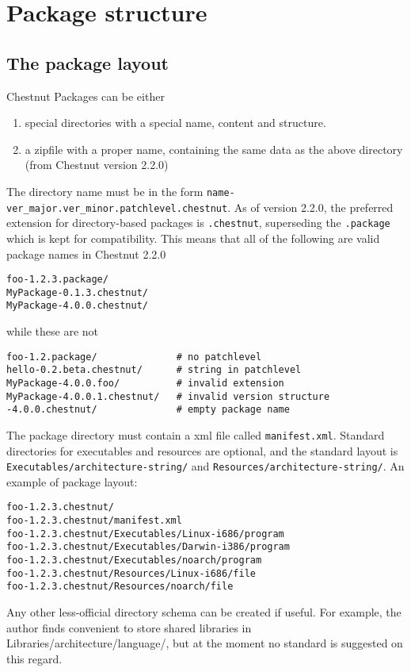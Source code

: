 \section{Package structure}

\subsection{The package layout}

Chestnut Packages can be either 
\begin{enumerate}
\item special directories with a special name, content and structure.
\item a zipfile with a proper name, containing the same data as the above directory (from Chestnut version 2.2.0) 
\end{enumerate}

The directory name must be in the form \verb+name-ver_major.ver_minor.patchlevel.chestnut+.
As of version 2.2.0, the preferred extension for directory-based packages is
\verb+.chestnut+, superseding the \verb+.package+ which is kept for compatibility.
This means that all of the following are valid package names in Chestnut 2.2.0
\begin{verbatim}
foo-1.2.3.package/
MyPackage-0.1.3.chestnut/
MyPackage-4.0.0.chestnut/
\end{verbatim}
while these are not
\begin{verbatim}
foo-1.2.package/              # no patchlevel
hello-0.2.beta.chestnut/      # string in patchlevel
MyPackage-4.0.0.foo/          # invalid extension
MyPackage-4.0.0.1.chestnut/   # invalid version structure
-4.0.0.chestnut/              # empty package name
\end{verbatim}

The package directory must contain a xml file called \verb+manifest.xml+.
Standard directories for executables and resources are optional, and the
standard layout is \verb+Executables/architecture-string/+ and
\verb+Resources/architecture-string/+.
An example of package layout:
\begin{verbatim}
foo-1.2.3.chestnut/
foo-1.2.3.chestnut/manifest.xml
foo-1.2.3.chestnut/Executables/Linux-i686/program
foo-1.2.3.chestnut/Executables/Darwin-i386/program
foo-1.2.3.chestnut/Executables/noarch/program
foo-1.2.3.chestnut/Resources/Linux-i686/file
foo-1.2.3.chestnut/Resources/noarch/file
\end{verbatim}

Any other less-official directory schema can be created if useful. For example,
the author finds convenient to store shared libraries in
Libraries/architecture/language/, but at the moment no standard is suggested on
this regard.

